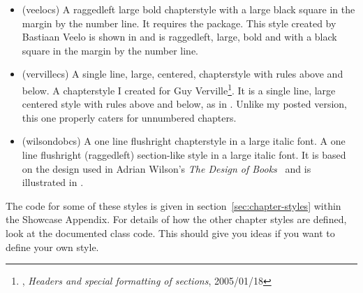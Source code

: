 \begin{itemize}



\item[\cstyle{veelo}]
\glossary(veelocs)%
  {}%
  {A raggedleft large bold chapterstyle with a large black square 
   in the margin by the number line. It requires the  package.}
   This style created by Bastiaan Veelo 
  is shown in  and is raggedleft, large, bold and with a
  black square in the margin by the number line. 




\item[\cstyle{verville}]
\glossary(vervillecs)%
  {}%
  {A single line, large, centered, chapterstyle with rules above and below.}
 A chapterstyle I created for 
  Guy Verville\footnote{\ctt,
  \textit{Headers and special formatting of sections}, 2005/01/18}. 
  It is a single line, large centered style with rules above 
  and below, as in . Unlike my posted version, 
  this one properly caters for unnumbered chapters.


\item[\cstyle{wilsondob}] 
\glossary(wilsondobcs)%
  {}%
  {A one line flushright chapterstyle in a large italic font.}
A one line flushright (raggedleft) section-like style in a large italic font. 
It is based on the design used in
Adrian Wilson's \textit{The Design of Books}~\cite{ADRIANWILSON93} and 
is illustrated in 
.


\end{itemize}


The code for some of these styles is given in
section~\ref{sec:chapter-styles} within the Showcase Appendix.  For
details of how the other chapter styles are defined, look at the
documented class code. This should give you ideas if you want to
define your own style.

